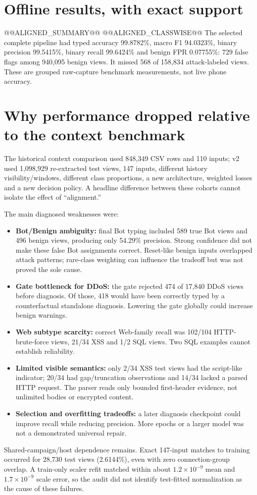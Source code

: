 \documentclass[11pt,a4paper,oneside]{report}
\begin{document}
\section{Offline results, with exact support}
@@ALIGNED_SUMMARY@@
@@ALIGNED_CLASSWISE@@
The selected complete pipeline had typed accuracy 99.8782\%, macro F1 94.0323\%, binary precision 99.5415\%, binary recall 99.6424\% and benign FPR 0.07755\%: 729 false flags among 940,095 benign views. It missed 568 of 158,834 attack-labeled views. These are grouped raw-capture benchmark measurements, not live phone accuracy.

\section{Why performance dropped relative to the context benchmark}
The historical context comparison used 848,349 CSV rows and 110 inputs; v2 used 1,098,929 re-extracted test views, 147 inputs, different history visibility/windows, different class proportions, a new architecture, weighted losses and a new decision policy. A headline difference between these cohorts cannot isolate the effect of ``alignment.''

The main diagnosed weaknesses were:
\begin{itemize}
\item \textbf{Bot/Benign ambiguity:} final Bot typing included 589 true Bot views and 496 benign views, producing only 54.29\% precision. Strong confidence did not make these false Bot assignments correct. Reset-like benign inputs overlapped attack patterns; rare-class weighting can influence the tradeoff but was not proved the sole cause.
\item \textbf{Gate bottleneck for DDoS:} the gate rejected 474 of 17,840 DDoS views before diagnosis. Of those, 418 would have been correctly typed by a counterfactual standalone diagnosis. Lowering the gate globally could increase benign warnings.
\item \textbf{Web subtype scarcity:} correct Web-family recall was 102/104 HTTP-brute-force views, 21/34 XSS and 1/2 SQL views. Two SQL examples cannot establish reliability.
\item \textbf{Limited visible semantics:} only 2/34 XSS test views had the script-like indicator; 20/34 had gap/truncation observations and 14/34 lacked a parsed HTTP request. The parser reads only bounded first-header evidence, not unlimited bodies or encrypted content.
\item \textbf{Selection and overfitting tradeoffs:} a later diagnosis checkpoint could improve recall while reducing precision. More epochs or a larger model was not a demonstrated universal repair.
\end{itemize}
Shared-campaign/host dependence remains. Exact 147-input matches to training occurred for 28,730 test views (2.6144\%), even with zero connection-group overlap. A train-only scaler refit matched within about $1.2\times10^{-9}$ mean and $1.7\times10^{-9}$ scale error, so the audit did not identify test-fitted normalization as the cause of these failures.
\end{document}
